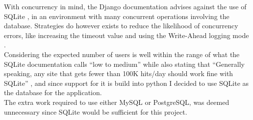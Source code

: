 With concurrency in mind, the Django documentation advises against the use of SQLite \cite{Django_db_lock}, in an environment with many concurrent operations involving the database. Strategies do however exists to reduce the likelihood of concurrency errors, like increasing the timeout value and using the Write-Ahead logging mode \cite{SQLite_testing,SQLite_wal}.\\Considering the expected number of users is well within the range of what the SQLite documentation calls ``low to medium'' while also stating that ``Generally speaking, any site that gets fewer than 100K hits/day should work fine with SQLite'' \cite{sqlite_when}, and since support for it is build into python I decided to use SQLite as the database for the application.\\The extra work required to use either MySQL or PostgreSQL, was deemed unnecessary since SQLite would be sufficient for this project.

